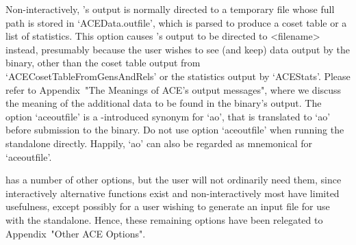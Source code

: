 Non-interactively, {\ACE}'s output is normally directed to a temporary
file whose full path is stored in `ACEData.outfile', which  is  parsed
to produce a coset table or a list of statistics. This  option  causes
{\ACE}'s output to  be  directed  to  <filename>  instead,  presumably
because the user wishes to see (and keep) data output  by  the  {\ACE}
binary,    other    than    the    coset     table     output     from
`ACECosetTableFromGensAndRels' or the statistics output by `ACEStats'.
Please refer to Appendix~"The  Meanings  of  ACE's  output  messages",
where we discuss the meaning of the additional data to be found in the
{\ACE} binary's output. The option `aceoutfile' is a {\GAP}-introduced
synonym for `ao', that is translated to `ao' before submission to  the
{\ACE} binary.  Do  not  use  option  `aceoutfile'  when  running  the
standalone directly. Happily, `ao' can also be regarded as  mnemonical
for `aceoutfile'.

\enditems


{\ACE} has a number of other options, but the  {\GAP}  user  will  not
ordinarily need them, since interactively alternative functions  exist
and non-interactively most have limited  usefulness,  except  possibly
for a user wishing to generate an input file for use with  the  {\ACE}
standalone. Hence, these remaining  options  have  been  relegated  to
Appendix~"Other ACE Options".

